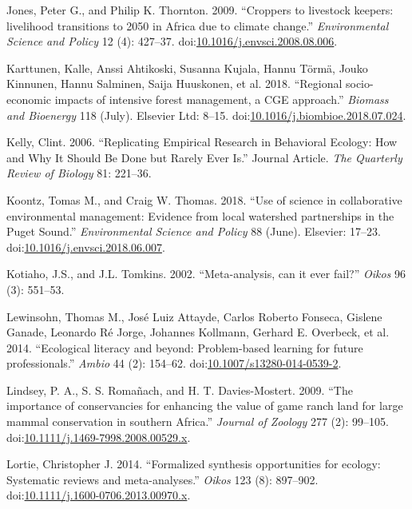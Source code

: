 \documentclass[fleqn,10pt]{wlpeerj} %
\begin{document}
\hypertarget{ref-Jones2009}{}
Jones, Peter G., and Philip K. Thornton. 2009. ``Croppers to livestock
keepers: livelihood transitions to 2050 in Africa due to climate
change.'' \emph{Environmental Science and Policy} 12 (4): 427--37.
doi:\href{https://doi.org/10.1016/j.envsci.2008.08.006}{10.1016/j.envsci.2008.08.006}.

\hypertarget{ref-Karttunen2018}{}
Karttunen, Kalle, Anssi Ahtikoski, Susanna Kujala, Hannu Törmä, Jouko
Kinnunen, Hannu Salminen, Saija Huuskonen, et al. 2018. ``Regional
socio-economic impacts of intensive forest management, a CGE approach.''
\emph{Biomass and Bioenergy} 118 (July). Elsevier Ltd: 8--15.
doi:\href{https://doi.org/10.1016/j.biombioe.2018.07.024}{10.1016/j.biombioe.2018.07.024}.

\hypertarget{ref-Kelly2006}{}
Kelly, Clint. 2006. ``Replicating Empirical Research in Behavioral
Ecology: How and Why It Should Be Done but Rarely Ever Is.'' Journal
Article. \emph{The Quarterly Review of Biology} 81: 221--36.

\hypertarget{ref-Koontz2018}{}
Koontz, Tomas M., and Craig W. Thomas. 2018. ``Use of science in
collaborative environmental management: Evidence from local watershed
partnerships in the Puget Sound.'' \emph{Environmental Science and
Policy} 88 (June). Elsevier: 17--23.
doi:\href{https://doi.org/10.1016/j.envsci.2018.06.007}{10.1016/j.envsci.2018.06.007}.

\hypertarget{ref-Kotiaho2002}{}
Kotiaho, J.S., and J.L. Tomkins. 2002. ``Meta-analysis, can it ever
fail?'' \emph{Oikos} 96 (3): 551--53.

\hypertarget{ref-Lewinsohn2014}{}
Lewinsohn, Thomas M., José Luiz Attayde, Carlos Roberto Fonseca, Gislene
Ganade, Leonardo Ré Jorge, Johannes Kollmann, Gerhard E. Overbeck, et
al. 2014. ``Ecological literacy and beyond: Problem-based learning for
future professionals.'' \emph{Ambio} 44 (2): 154--62.
doi:\href{https://doi.org/10.1007/s13280-014-0539-2}{10.1007/s13280-014-0539-2}.

\hypertarget{ref-Lindsey2009}{}
Lindsey, P. A., S. S. Romañach, and H. T. Davies-Mostert. 2009. ``The
importance of conservancies for enhancing the value of game ranch land
for large mammal conservation in southern Africa.'' \emph{Journal of
Zoology} 277 (2): 99--105.
doi:\href{https://doi.org/10.1111/j.1469-7998.2008.00529.x}{10.1111/j.1469-7998.2008.00529.x}.

\hypertarget{ref-Lortie2014}{}
Lortie, Christopher J. 2014. ``Formalized synthesis opportunities for
ecology: Systematic reviews and meta-analyses.'' \emph{Oikos} 123 (8):
897--902.
doi:\href{https://doi.org/10.1111/j.1600-0706.2013.00970.x}{10.1111/j.1600-0706.2013.00970.x}.
\end{document}
